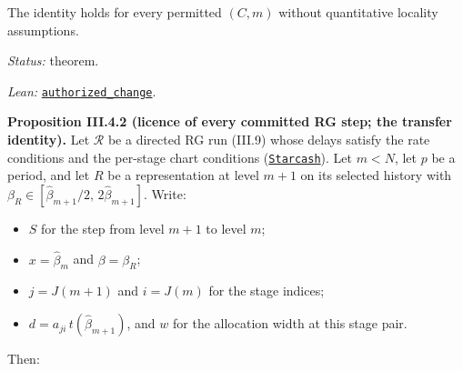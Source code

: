 \documentclass[
  letterpaper,
  11pt]{article}
\providecommand{\tightlist}{%
  \setlength{\itemsep}{0pt}\setlength{\parskip}{0pt}}
\begin{document}
The identity holds for every permitted \((C,m)\) without quantitative
locality assumptions.

\emph{Status:} theorem.

\emph{Lean:}
\href{https://github.com/yang-mills-group/OpenAI-YM-20261028/blob/3456e5e75cf8d4cd558955a5c7638fba2d68f464/YM/SectorNext/GAUSSIAN_SECTOR_CHANGE/Change.lean\#L137-L192}{\texttt{authorized\_change}}.

\textbf{Proposition III.4.2 (licence of every committed RG step; the
transfer identity).} Let \(\mathscr R\) be a directed RG run (III.9)
whose delays satisfy the rate conditions and the per-stage chart
conditions
(\href{https://github.com/yang-mills-group/OpenAI-YM-20261028/blob/3456e5e75cf8d4cd558955a5c7638fba2d68f464/YM/SectorNext/GAUSSIAN_SECTOR_CHANGE/Handoff.lean\#L57-L71}{\texttt{Starcash}}).
Let \(m<N\), let \(p\) be a period, and let \(R\) be a representation at
level \(m+1\) on its selected history with
\(\beta_R\in[\hat\beta_{m+1}/2,\,2\hat\beta_{m+1}]\). Write:

\begin{itemize}
\tightlist
\item
  \(S\) for the step from level \(m+1\) to level \(m\);
\item
  \(x=\hat\beta_m\) and \(\beta=\beta_R\);
\item
  \(j=J(m+1)\) and \(i=J(m)\) for the stage indices;
\item
  \(d=a_{ji}\,t(\hat\beta_{m+1})\), and \(w\) for the allocation width
  at this stage pair.
\end{itemize}

Then:
\end{document}
